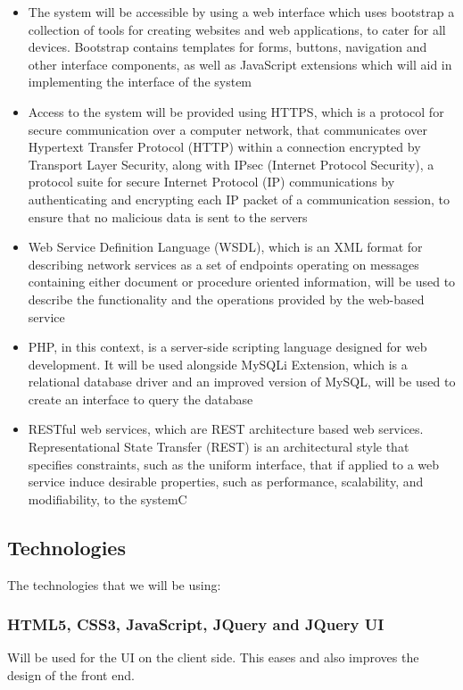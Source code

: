 \documentclass[11pt]{article}
\begin{document}
		\begin{itemize}
			\item The system will be accessible by using a web interface which uses bootstrap a collection of tools for creating websites and web applications, to cater for all devices. Bootstrap contains templates for forms, buttons, navigation and other interface components, as well as JavaScript extensions which will aid in implementing the interface of the system
			
			\item Access to the system will be provided using HTTPS, which is a protocol for secure communication over a computer network, that communicates over Hypertext Transfer Protocol (HTTP) within a connection encrypted by Transport Layer Security, along with IPsec (Internet Protocol Security), a protocol suite for secure Internet Protocol (IP) communications by authenticating and encrypting each IP packet of a communication session, to ensure that no malicious data is sent to the servers
			
			\item Web Service Definition Language (WSDL), which is an XML format for describing network services as a set of endpoints operating on messages containing either document or procedure oriented information, will be used to describe the functionality and the operations provided by the web-based service
			
			\item PHP, in this context, is a server-side scripting language designed for web development. It will be used alongside MySQLi Extension, which is a relational database driver and an improved version of MySQL,  will be used to create an interface to query the database
			
			\item RESTful web services, which are REST architecture based web services. Representational State Transfer (REST) is an architectural style that specifies constraints, such as the uniform interface, that if applied to a web service induce desirable properties, such as performance, scalability, and modifiability, to the systemC
		\end{itemize}
	
	\subsection{Technologies}
	The technologies that we will be using:
	\subsubsection{HTML5, CSS3, JavaScript, JQuery and JQuery UI}
	Will be used for the UI on the client side. This eases and also improves the design of the front end.
\end{document}
